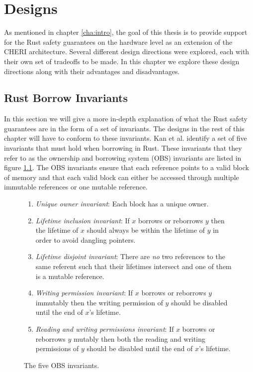 \chapter{Designs}
As mentioned in chapter \ref{cha:intro}, the goal of this thesis is to provide support for the Rust safety guarantees on the hardware level as an extension of the CHERI architecture. Several different design directions were explored, each with their own set of tradeoffs to be made. In this chapter we explore these design directions along with their advantages and disadvantages.

\section{Rust Borrow Invariants}
In this section we will give a more in-depth explanation of what the Rust safety guarantees are in the form of a set of invariants. The designs in the rest of this chapter will have to conform to these invariants.
Kan et al. \cite{Kan2018AnEO} identify a set of five invariants that must hold when borrowing in Rust. These invariants that they refer to as the ownership and borrowing system (OBS) invariants are listed in figure \ref{fig:obsinvariants}. The OBS invariants ensure that each reference points to a valid block of memory and that each valid block can either be accessed through multiple immutable references or one mutable reference.

\begin{figure}[h]
\centering
\begin{enumerate}
    \item \textit{Unique owner invariant}: Each block has a unique owner.
    \item \textit{Lifetime inclusion invariant}: If $x$ borrows or reborrows $y$ then the lifetime of $x$ should always be within the lifetime of $y$ in order to avoid dangling pointers.
    \item \textit{Lifetime disjoint invariant}: There are \textit{no} two references to the same referent such that their lifetimes intersect and one of them is a mutable reference.
    \item \textit{Writing permission invariant}: If $x$ borrows or reborrows $y$ immutably then the writing permission of $y$ should be disabled until the end of $x$'s lifetime.
    \item \textit{Reading and writing permissions invariant}: If $x$ borrows or reborrows $y$ mutably then both the reading and writing permissions of $y$ should be disabled until the end of $x$'s lifetime.
\end{enumerate}
\caption{The five OBS invariants.\cite{Kan2018AnEO}}
\label{fig:obsinvariants}
\end{figure}


